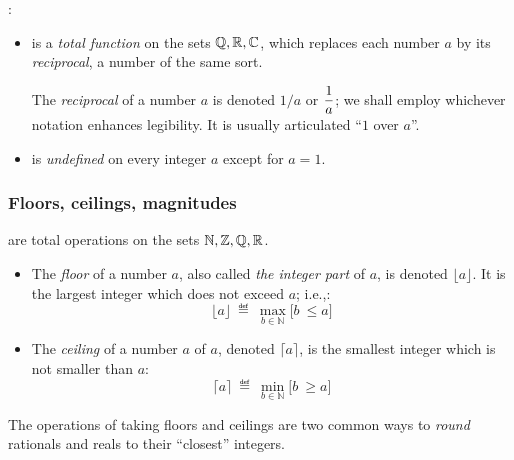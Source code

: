 \medskip

 

:
\begin{itemize}
\item
is a {\em total function} on the sets $\mathbb{Q}, \mathbb{R}, \mathbb{C}$, which replaces each number $a$ by its {\em reciprocal}, a number of the same sort.

\smallskip

The {\it reciprocal} of  a number $a$ is denoted $1/a$ or $\displaystyle {1 \over a}$; we shall employ whichever notation enhances legibility.  It is usually articulated ``$1$ over $a$''.

\item
is {\em undefined} on every integer $a$ except for $a=1$.
\end{itemize}

\subsubsection{Floors, ceilings, magnitudes}

are total operations on the sets $\mathbb{N}, \mathbb{Z}, \mathbb{Q}, \mathbb{R}$.
\begin{itemize}
\item
The {\it floor} of a number $a$, also called {\it the integer part} of $a$, is denoted $\lfloor a \rfloor$.  It is the largest integer which does not exceed $a$; i.e.,:
\[
\lfloor a \rfloor \ \eqdef \ \max_{b \in {\mathbb{N}}} \Big[ b \ \leq a \Big]
\]
\item
The {\it ceiling} of a number $a$ of $a$, denoted $\lceil a \rceil$, is the smallest integer which is 
not smaller than $a$:
\[
\lceil a \rceil \ \eqdef \ \min_{b \in {\mathbb{N}}} \Big[ b \ \geq a \Big]
\]
\end{itemize}
The operations of taking floors and ceilings are two common ways to {\em round} rationals and reals to their ``closest'' integers.

